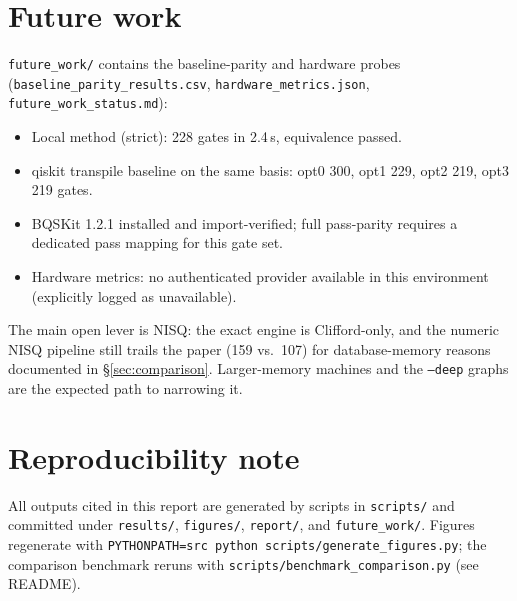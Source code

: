 \documentclass[11pt,a4paper]{article}
\begin{document}
\section{Future work}
\texttt{future\_work/} contains the baseline-parity and hardware probes
(\texttt{baseline\_parity\_results.csv}, \texttt{hardware\_metrics.json},
\texttt{future\_work\_status.md}):
\begin{itemize}
    \item Local method (strict): 228 gates in 2.4\,s, equivalence passed.
    \item qiskit transpile baseline on the same basis: opt0 300, opt1 229, opt2 219, opt3 219 gates.
    \item BQSKit 1.2.1 installed and import-verified; full pass-parity requires a dedicated pass mapping for this gate set.
    \item Hardware metrics: no authenticated provider available in this environment (explicitly logged as unavailable).
\end{itemize}
The main open lever is NISQ: the exact engine is Clifford-only, and the numeric
NISQ pipeline still trails the paper (159 vs.\ 107) for database-memory reasons
documented in \S\ref{sec:comparison}. Larger-memory machines and the
\texttt{--deep} graphs are the expected path to narrowing it.

\section*{Reproducibility note}
All outputs cited in this report are generated by scripts in \texttt{scripts/}
and committed under \texttt{results/}, \texttt{figures/}, \texttt{report/}, and
\texttt{future\_work/}. Figures regenerate with
\texttt{PYTHONPATH=src python scripts/generate\_figures.py}; the comparison
benchmark reruns with \texttt{scripts/benchmark\_comparison.py} (see README).
\end{document}
